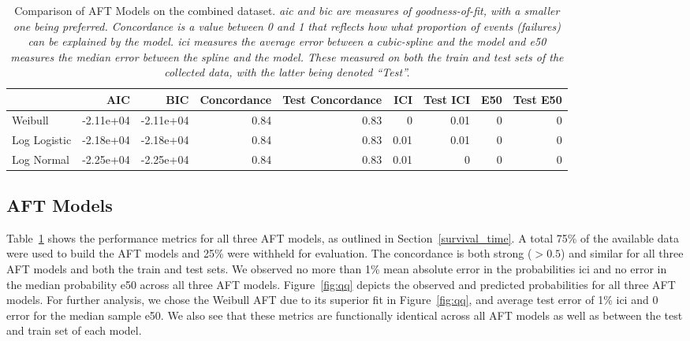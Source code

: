 \documentclass[conference]{IEEEtran}
\newcommand{\cm}[1]{\textit{{\color{blue}#1}}}
\begin{document}
\begin{table}
\centering
\caption{Comparison of AFT Models on the combined dataset. \cm{\acrshort{aic} and \acrshort{bic} are measures of goodness-of-fit, with a smaller one being preferred. Concordance is a value between 0 and 1 that reflects how what proportion of events (failures) can be explained by the model. \acrshort{ici} measures the average error between a cubic-spline and the model and \acrshort{e50} measures the median error between the spline and the model. These measured on both the train and test sets of the collected data, with the latter being denoted ``Test''.}}
\label{tab:combined}
\begin{tabular}{lrrrrrrrr}
\toprule
 & AIC & BIC & Concordance & Test Concordance & ICI & Test ICI & E50 & Test E50 \\
\midrule
Weibull & -2.11e+04 & -2.11e+04 & 0.84 & 0.83 & 0 & 0.01 & 0 & 0 \\
Log Logistic & -2.18e+04 & -2.18e+04 & 0.84 & 0.83 & 0.01 & 0.01 & 0 & 0 \\
Log Normal & -2.25e+04 & -2.25e+04 & 0.84 & 0.83 & 0.01 & 0 & 0 & 0 \\
\bottomrule
\end{tabular}
\end{table}

\subsection{AFT Models}
\label{res:aft}

Table~\ref{tab:combined} shows the performance metrics for all three AFT models, as outlined in Section~\ref{survival_time}. A total 75\% of the available data were used to build the AFT models and 25\% were withheld for evaluation. The concordance is both strong ($>0.5$) and similar for all three AFT models and both the train and test sets. We observed no more than 1\% mean absolute error in the probabilities \acrshort{ici} and no error in the median probability \acrshort{e50} across all three AFT models. Figure~\ref{fig:qq} depicts the observed and predicted probabilities for all three AFT models. For further analysis, we chose the Weibull AFT due to its superior fit in Figure~\ref{fig:qq}, and average test error of 1\% \acrshort{ici} and 0 error for the median sample \acrshort{e50}. We also see that these metrics are  functionally identical across all AFT models as well as between the test and train set of each model. 
\end{document}
